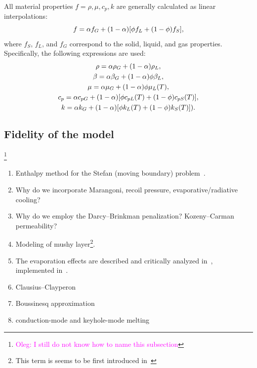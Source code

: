 \documentclass{article}
\newcommand{\oleg}[1]{\textcolor{magenta}{\footnote{\textcolor{magenta}{Oleg: #1}}}} %
\begin{document}
All material properties $f = \rho, \mu, c_p, k$ are generally calculated as linear interpolations:
\begin{equation}\label{eq:properties}
    f = \alpha f_G + (1-\alpha)\qty[\phi f_L + (1-\phi)f_S],
\end{equation}
where $f_S$, $f_L$, and $f_G$ correspond to the solid, liquid, and gas properties.
Specifically, the following expressions are used:
\begin{gather}
    \rho = \alpha\rho_G + (1-\alpha)\rho_L, \label{eq:rho}\\
    \beta = \alpha\beta_G + (1-\alpha)\phi\beta_L, \label{eq:beta}\\
    \mu = \alpha\mu_G + (1-\alpha)\phi\mu_L(T), \label{eq:mu}\\
    c_p = \alpha c_{pG} + (1-\alpha)\qty[\phi c_{pL}(T) + (1-\phi)c_{pS}(T)], \label{eq:c_p}\\
    k = \alpha k_G + (1-\alpha)\qty[\phi k_L(T) + (1-\phi)k_S(T)]). \label{eq:k}
\end{gather}

\subsection{Fidelity of the model}\oleg{I still do not know how to name this subsection}

\begin{enumerate}
    \item Enthalpy method for the Stefan (moving boundary) problem~\cite{kamenomostskaja1961stefan, atthey1974finite, fedorenko1975difference, voller1981accurate}.
    \item Why do we incorporate Marangoni, recoil pressure, evaporative/radiative cooling?
    \item Why do we employ the Darcy--Brinkman penalization?\cite{voller1987fixed, le2006interfacial} Kozeny--Carman permeability?
    \item Modeling of mushy layer\footnote{This term is seems to be first introduced in~\cite{tien1967heat}}.
    \item The evaporation effects are described and critically analyzed in~\cite{cook2019simulation}, implemented in~\cite{khairallah2016laser}.
    \item Clausius--Clayperon~\cite{klassen2014evaporation, cook2019simulation}
    \item Boussinesq approximation
    \item conduction-mode and keyhole-mode melting
\end{enumerate}
\end{document}
